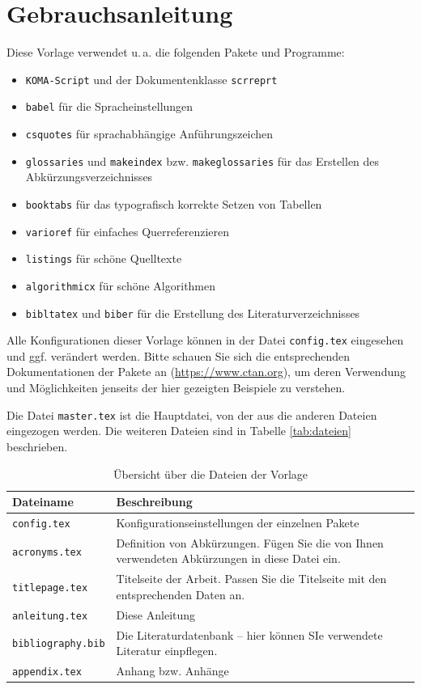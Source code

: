 \chapter{Gebrauchsanleitung}
Diese Vorlage verwendet u.\,a. die folgenden Pakete und Programme: 
\begin{itemize}
	\item\texttt{KOMA-Script} und der Dokumentenklasse \texttt{scrreprt}
	\item \texttt{babel} für die Spracheinstellungen
	\item \texttt{csquotes} für sprachabhängige Anführungszeichen 
	\item \texttt{glossaries} und \texttt{makeindex} bzw. \texttt{makeglossaries} für das Erstellen des Abkürzungsverzeichnisses 
	\item \texttt{booktabs} für das typografisch korrekte Setzen von Tabellen 
	\item \texttt{varioref} für einfaches Querreferenzieren 
	\item \texttt{listings} für schöne Quelltexte
	\item \texttt{algorithmicx} für schöne Algorithmen
	\item \texttt{bibltatex} und \texttt{biber} für die Erstellung des Literaturverzeichnisses 
\end{itemize}
Alle Konfigurationen dieser Vorlage können in der Datei \texttt{config.tex} eingesehen und ggf. verändert werden. Bitte schauen Sie sich die entsprechenden Dokumentationen 
der Pakete an (\url{https://www.ctan.org}), um deren Verwendung und Möglichkeiten jenseits der hier gezeigten Beispiele zu verstehen.

Die Datei \texttt{master.tex} ist die Hauptdatei, von der aus die anderen Dateien eingezogen werden. Die weiteren Dateien sind in Tabelle \vref{tab:dateien} beschrieben.
 
\begin{table}
	\centering
\begin{tabular}{lp{10cm}}
	\textbf{Dateiname} & \textbf{Beschreibung}\\\toprule
	\texttt{config.tex} & Konfigurationseinstellungen der einzelnen Pakete\\
	\texttt{acronyms.tex} & Definition von Abkürzungen. Fügen Sie die von Ihnen verwendeten Abkürzungen in diese Datei ein.\\
	\texttt{titlepage.tex} & Titelseite der Arbeit. Passen Sie die Titelseite mit den entsprechenden Daten an.\\
	\texttt{anleitung.tex} & Diese Anleitung\\ 
	\texttt{bibliography.bib}&  Die Literaturdatenbank -- hier können SIe verwendete Literatur einpflegen.\\
	\texttt{appendix.tex} & Anhang bzw. Anhänge \\\bottomrule
\end{tabular}
\caption{\label{tab:dateien}Übersicht über die Dateien der Vorlage}
\end{table}

